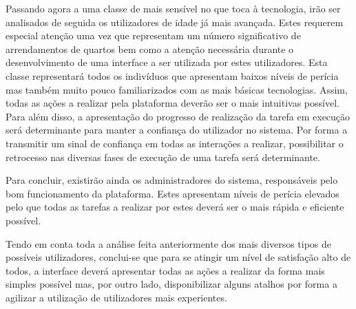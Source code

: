 Passando agora a uma classe de mais sensível no que toca à tecnologia, irão ser analisados de seguida os utilizadores de idade já mais avançada. Estes requerem especial atenção uma vez que representam um número significativo de arrendamentos de quartos bem como a atenção necessária durante o desenvolvimento de uma interface a ser utilizada por estes utilizadores. Esta classe representará todos os indivíduos que apresentam baixos níveis de perícia mas também muito pouco familiarizados com as mais básicas tecnologias. Assim, todas as ações a realizar pela plataforma deverão ser o mais intuitivas possível. Para além disso, a apresentação do progresso de realização da tarefa em execução será determinante para manter a confiança do utilizador no sistema. Por forma a transmitir um sinal de confiança em todas as interações a realizar, possibilitar o retrocesso nas diversas fases de execução de uma tarefa será determinante.

Para concluir, existirão ainda os administradores do sistema, responsáveis pelo bom funcionamento da plataforma. Estes apresentam níveis de perícia elevados pelo que todas as tarefas a realizar por estes deverá ser o mais rápida e eficiente possível.

Tendo em conta toda a análise feita anteriormente dos mais diversos tipos de possíveis utilizadores, conclui-se que para se atingir um nível de satisfação alto de todos, a interface deverá apresentar todas as ações a realizar da forma mais simples possível mas, por outro lado, disponibilizar alguns atalhos por forma a agilizar a utilização de utilizadores mais experientes.

